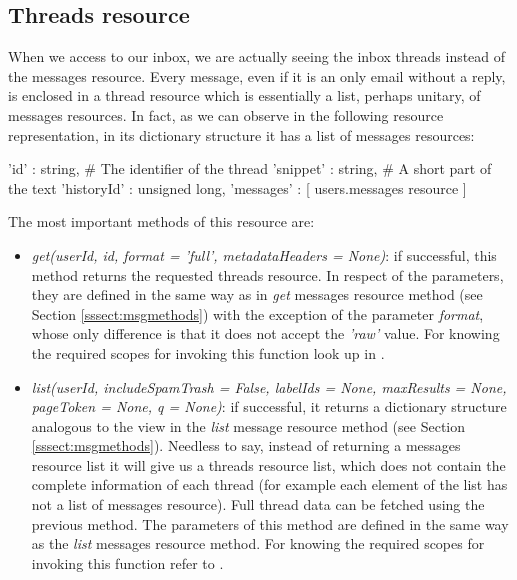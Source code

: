 \subsection{Threads resource}\label{ssect:threads}
When we access to our inbox, we are actually seeing the inbox threads instead of the messages resource. Every message, even if it is an only email without a reply, is enclosed in a thread resource \citep[/v1/reference/users/threads]{gmailAPI} which is essentially a list, perhaps unitary, of messages resources. In fact, as we can observe in the following resource representation, in its dictionary structure it has a list of messages resources:

\begin{python}
	{
		'id' : string, # The identifier of the thread
		'snippet' : string, # A short part of the text
		'historyId' : unsigned long,
		'messages' : [ users.messages resource ]
	}
\end{python}

The most important methods of this resource are:
\begin{itemize}
	\item\textit{get(userId, id, format = 'full', metadataHeaders = None)}: if successful, this method returns the requested threads resource. In respect of the parameters, they are defined in the same way as in \textit{get} messages resource method (see Section \ref{sssect:msgmethods}) with the exception of the parameter \textit{format}, whose only difference is that it does not accept the \textit{'raw'} value. For knowing the required scopes for invoking this function look up in \cite[/v1/reference/users/threads/get]{gmailAPI}.
	\item\textit{list(userId, includeSpamTrash = False, labelIds = None, maxResults = None, pageToken = None, q = None)}: if successful, it returns a dictionary structure analogous to the view in the \textit{list} message resource method (see Section \ref{sssect:msgmethods}). Needless to say, instead of returning a messages resource list it will give us a threads resource list, which does not contain the complete information of each thread (for example each element of the list has not a list of messages resource). Full thread data can be fetched using the previous method. The parameters of this method are defined in the same way as the \textit{list} messages resource method. For knowing the required scopes for invoking this function refer to \cite[/v1/reference/users/threads/list]{gmailAPI}.
\end{itemize}

